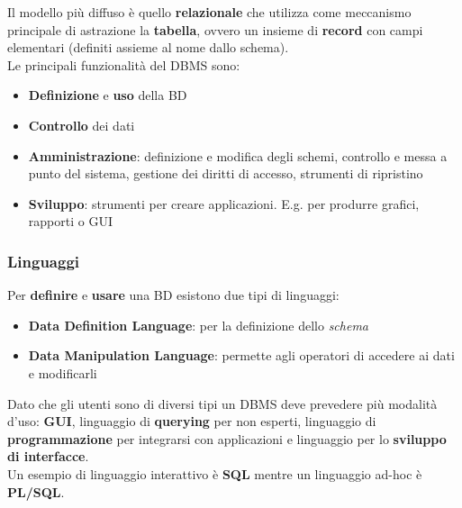Il modello più diffuso è quello \textbf{relazionale} che utilizza come meccanismo principale di astrazione la \textbf{tabella}, ovvero un insieme di \textbf{record} con campi elementari (definiti assieme al nome dallo schema).\\
Le principali funzionalità del DBMS sono:
\begin{itemize}
	\item \textbf{Definizione} e \textbf{uso} della BD
	\item \textbf{Controllo} dei dati
	\item \textbf{Amministrazione}: definizione e modifica degli schemi, controllo e messa a punto del sistema, gestione dei diritti di accesso, strumenti di ripristino
	\item \textbf{Sviluppo}: strumenti per creare applicazioni. E.g. per produrre grafici, rapporti o GUI
\end{itemize}

\subsubsection{Linguaggi}
Per \textbf{definire} e \textbf{usare} una BD esistono due tipi di linguaggi:
\begin{itemize}
	\item \textbf{Data Definition Language}: per la definizione dello \textit{schema}
	\item \textbf{Data Manipulation Language}: permette agli operatori di accedere ai dati e modificarli
\end{itemize}
Dato che gli utenti sono di diversi tipi un DBMS deve prevedere più modalità d'uso: \textbf{GUI}, linguaggio di \textbf{querying} per non esperti, linguaggio di \textbf{programmazione} per integrarsi con applicazioni e linguaggio per lo \textbf{sviluppo di interfacce}.\\
Un esempio di linguaggio interattivo è \textbf{SQL} mentre un linguaggio ad-hoc è \textbf{PL/SQL}.

